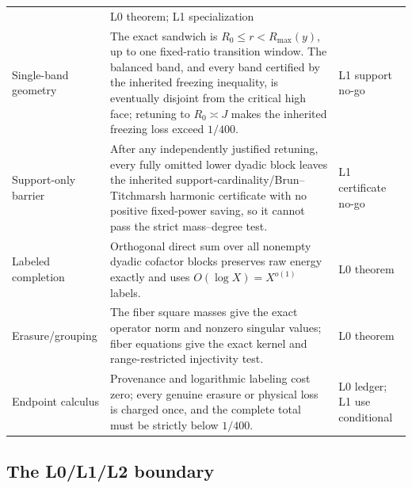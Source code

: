 \begin{longtable}{>{\raggedright\arraybackslash}p{}
                 >{\raggedright\arraybackslash}p{}
                 >{\raggedright\arraybackslash}p{}}
& L0 theorem; L1 specialization\\
\addlinespace
Single-band geometry
& The exact sandwich is \(R_0\le r<R_{\max}(y)\), up to one fixed-ratio
  transition window.  The balanced band, and every band certified by the
  inherited freezing inequality, is eventually disjoint from the critical
  high face; retuning to \(R_0\asymp J\) makes the inherited freezing loss
  exceed \(1/400\).
& L1 support no-go\\
\addlinespace
Support-only barrier
& After any independently justified retuning, every fully omitted lower
  dyadic block leaves the inherited
  support-cardinality/Brun--Titchmarsh harmonic certificate with no positive
  fixed-power saving, so it cannot pass the strict mass--degree test.
& L1 certificate no-go\\
\addlinespace
Labeled completion
& Orthogonal direct sum over all nonempty dyadic cofactor blocks preserves
  raw energy exactly and uses \(O(\log X)=X^{o(1)}\) labels.
& L0 theorem\\
\addlinespace
Erasure/grouping
& The fiber square masses give the exact operator norm and nonzero singular
  values; fiber equations give the exact kernel and range-restricted
  injectivity test.
& L0 theorem\\
\addlinespace
Endpoint calculus
& Provenance and logarithmic labeling cost zero; every genuine erasure or
  physical loss is charged once, and the complete total must be strictly
  below \(1/400\).
& L0 ledger; L1 use conditional\\
\bottomrule
\end{longtable}
\endgroup

\subsection{The L0/L1/L2 boundary}

